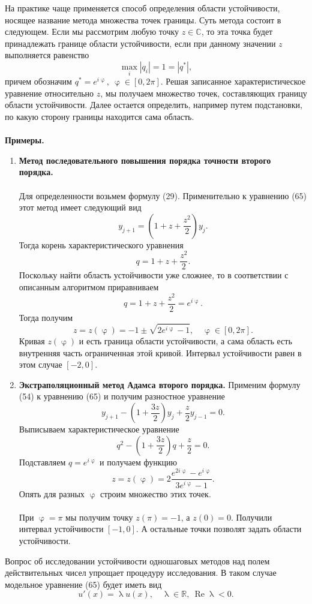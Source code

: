 \documentclass[a4paper, 12pt]{report}
\newcommand{\Rm}{\mathbb{R}}
\newcommand{\Cm}{\mathbb{C}}
\renewcommand{\varphi}{\upvarphi}
\renewcommand{\lambda}{\uplambda}
\renewcommand{\Re}{\operatorname{Re}}
\begin{document}
	 На практике чаще применяется способ определения области устойчивости, носящее название метода множества точек границы. Суть метода состоит в следующем. Если мы рассмотрим любую точку $z \in \Cm$, то эта точка будет принадлежать границе области устойчивости, если при данному значении $z$ выполняется равенство $$\underset{i}{\max}|q_i| = 1 = |q^*|,$$
	 причем обозначим $q^* = e^{i\varphi},\ \varphi \in [0, 2\pi].$ Решая записанное характеристическое уравнение относительно $z$, мы получаем множество точек, составляющих границу области устойчивости. Далее остается определить, например путем подстановки, по какую сторону границы находится сама область.\\\\
	 \textbf{Примеры.}
	 \begin{enumerate}
	 	\item \textbf{Метод последовательного повышения порядка точности второго порядка.}\\\\
	 	Для определенности возьмем формулу (29). Применительно к уравнению (65) этот метод имеет следующий вид $$y_{j+1} = \left(1+z + \dfrac {z^2}{2}\right)y_j.$$
	 	Тогда корень характеристического уравнения $$q = 1 + z + \dfrac{z^2}{2}.$$
	 	Поскольку найти область устойчивости уже сложнее, то в соответствии с описанным алгоритмом приравниваем $$q = 1 + z + \dfrac{z^2}{2} = e^{i\varphi}.$$
	 	Тогда получим $$z = z(\varphi) = - 1 \pm \sqrt {2e^{i\varphi}-1},\quad\varphi \in [0,2\pi].$$
	 	Кривая $z(\varphi)$ и есть граница области устойчивости, а сама область есть внутренняя часть ограниченная этой кривой. Интервал устойчивости равен в этом случае $[-2, 0]$.
	 	\item \textbf{Экстраполяционный метод Адамса второго порядка.}
	 	Применим формулу (54) к уравнению (65) и получим разностное уравнение $$y_{j+1}  - \left(1 + \dfrac{3z}{2}\right)y_j + \dfrac z 2 y_{j-1} = 0.$$
	 	Выписываем характеристическое уравнение $$q^2  - \left(1 + \dfrac{3z}{2}\right)q + \dfrac z 2  = 0.$$
	 	Подставляем $q = e^{i\varphi}$ и получаем функцию $$z = z(\varphi) = 2 \dfrac{e^{2i\varphi} - e^{i\varphi}}{3 e^{i\varphi} - 1}.$$
	 	Опять для разных $\varphi$ строим множество этих точек. \\\\
	 	При $\varphi = \pi$ мы получим точку $z(\pi) = -1$, а $z(0) = 0$. Получили интервал устойчивости $[-1, 0]$. А остальные точки позволят задать области устойчивости.  
	 \end{enumerate}
	 Вопрос об исследовании устойчивости одношаговых методов над полем действительных чисел упрощает процедуру исследования. В таком случае модельное уравнение (65) будет иметь вид $$u'(x) = \lambda u(x),\quad \lambda \in \Rm,\ \Re \lambda < 0.$$
\end{document}
